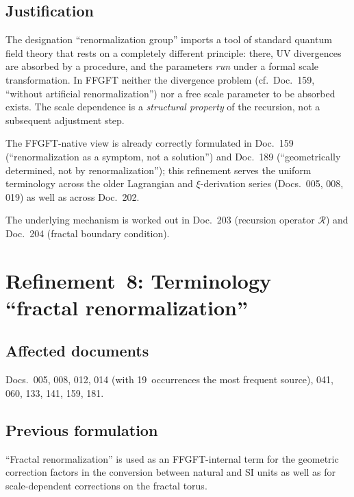 \medskip


\subsection*{Justification}

The designation \enquote{renormalization group} imports a tool of standard
quantum field theory that rests on a completely different principle: there, UV
divergences are absorbed by a procedure, and the parameters \emph{run} under a
formal scale transformation. In FFGFT neither the divergence problem (cf.\
Doc.~159, \enquote{without artificial renormalization}) nor a free scale
parameter to be absorbed exists. The scale dependence is a \emph{structural
property} of the recursion, not a subsequent adjustment step.

The FFGFT-native view is already correctly formulated in Doc.~159
(\enquote{renormalization as a symptom, not a solution}) and Doc.~189
(\enquote{geometrically determined, not by renormalization}); this refinement
serves the uniform terminology across the older Lagrangian and $\xi$-derivation
series (Docs.~005, 008, 019) as well as across Doc.~202.

The underlying mechanism is worked out in Doc.~203 (recursion operator
$\mathcal{R}$) and Doc.~204 (fractal boundary condition).

\section{\texorpdfstring{Refinement~8: Terminology \enquote{fractal renormalization}}{Refinement 8: Terminology fractal renormalization}}

\subsection*{Affected documents}

Docs.~005, 008, 012, 014 (with 19~occurrences the most frequent source),
041, 060, 133, 141, 159, 181.

\subsection*{Previous formulation}

\enquote{Fractal renormalization} is used as an FFGFT-internal term for the
geometric correction factors in the conversion between natural and SI units as
well as for scale-dependent corrections on the fractal torus.

